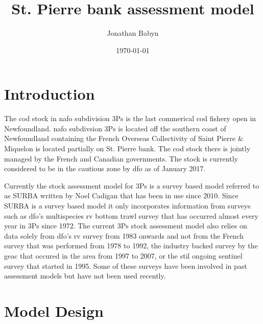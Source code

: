 \documentclass[11pt]{article}\usepackage[]{graphicx}\usepackage[]{color}
\begin{document}
\title{St. Pierre bank assessment model}
\author{Jonathan Babyn}
\date{\today}
\maketitle

\tableofcontents
\newpage

\printnomenclature

\section{Introduction}

The cod stock in \acrfull{nafo} subdivision 3Ps is the last commerical cod fishery open in Newfoundland. \acrshort{nafo} subdivsion 3Ps is located off the southern coast of Newfoundland containing the French Overseas Collectivity of Saint Pierre \& Miquelon is located partially on St. Pierre bank. The cod stock there is jointly managed by the French and Canadian governments. The stock is currently considered to be in the cautious zone by \acrshort{dfo} as of January 2017\cite{rideout2017assessing}.

Currently the stock assessment model for 3Ps is a survey based model referred to as SURBA written by Noel Cadigan that has been in use since 2010\cite{cadigan2010trends}. Since SURBA is a survey based model it only incorporates information from surveys such as \acrfull{dfo}'s multispecies \acrfull{rv} bottom trawl survey that has occurred almost every year in 3Ps since 1972\cite{doubleday1981manual}. The current 3Ps stock assessment model also relies on data solely from \acrshort{dfo}'s \acrshort{rv} survey from 1983 onwards and not from the French survey that was performed from 1978 to 1992, the industry backed survey by the \acrfull{geac} that occured in the area from 1997 to 2007, or the stil ongoing sentinel survey that started in 1995. Some of these surveys have been involved in past assessment models but have not been used recently\cite{brattey2005assessment}.  
\section{Model Design}
\end{document}
